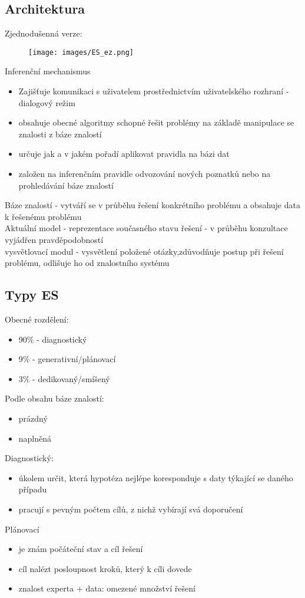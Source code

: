 \subsection{Architektura}
Zjednodušenná verze:
\begin{figure}[H]
    \texttt{[image: images/ES\_ez.png]}
\end{figure}
Inferenční mechanismus
\begin{itemize}
    \item Zajišťuje komunikaci s uživatelem prostřednictvím uživatelského rozhraní - dialogový režim
    \item obsahuje obecné algoritmy schopné řešit problémy na základě manipulace se znalosti z báze znalostí
    \item určuje jak a v jakém pořadí aplikovat pravidla na bázi dat
    \item založen na inferenčním pravidle odvozování nových poznatků nebo na prohledávání báze znalostí
\end{itemize}
Báze znalostí - vytváří se v průběhu řešení konkrétního problému a obsahuje data k řešenému problému\\
Aktuální model - reprezentace současného stavu řešení - v průběhu konzultace vyjádřen pravděpodobností\\
vysvětlovací modul - vysvětlení položené otázky,zdůvodňuje postup při řešení problému, odlišuje ho od znalostního systému

\subsection{Typy ES}
Obecné rozdělení:
\begin{itemize}
    \item 90\% - diagnostický
    \item 9\% - generativní/plánovací
    \item 3\% - dedikovaný/smíšený
\end{itemize}
Podle obsahu báze znalostí:
\begin{itemize}
    \item prázdný
    \item naplněná
\end{itemize}

Diagnostický:
\begin{itemize}
    \item úkolem určit, která hypotéza nejlépe koresponduje s daty týkající se daného případu
    \item pracují s pevným počtem cílů, z nichž vybírají svá doporučení
\end{itemize}
Plánovací
\begin{itemize}
    \item je znám počáteční stav a cíl řešení
    \item cíl nalézt posloupnost kroků, který k cíli dovede
    \item znalost experta + data: omezené množství řešení
\end{itemize}

